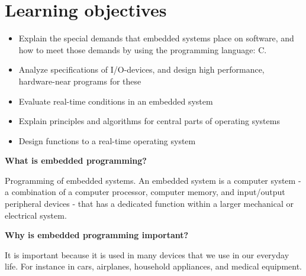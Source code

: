 \section{Learning objectives}


\begin{itemize}
	\item {Explain the special demands that embedded systems place on software, and how to meet
	      those demands by using the programming language: C.}
	      \item{Analyze specifications of I/O-devices, and design high performance, hardware-near programs for these}
	\item Evaluate real-time conditions in an embedded system
	\item Explain principles and algorithms for central parts of operating systems
	\item Design functions to a real-time operating system
\end{itemize}


\textbf{What is embedded programming?}

Programming of embedded systems. An embedded system is a computer system -
a combination of a computer processor, computer memory, and input/output peripheral devices -
that has a dedicated function within a larger mechanical or electrical system.

\textbf{Why is embedded programming important?}

It is important because it is used in many devices that we use in our everyday life.
For instance in cars, airplanes, household appliances, and medical equipment.




